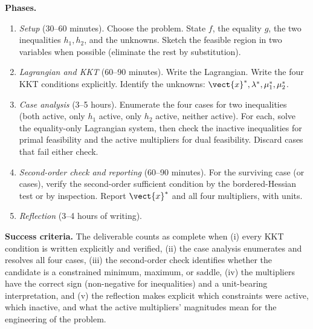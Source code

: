 \begin{project}
\textbf{Phases.}
\begin{enumerate}[leftmargin=*]
  \item \textit{Setup} (30--60 minutes). Choose the problem.
    State $f$, the equality $g$, the two inequalities $h_{1},
    h_{2}$, and the unknowns. Sketch the feasible region in two
    variables when possible (eliminate the rest by substitution).
  \item \textit{Lagrangian and KKT} (60--90 minutes). Write the
    Lagrangian. Write the four KKT conditions explicitly. Identify
    the unknowns: $\vect{x}^{*}, \lambda^{*}, \mu_{1}^{*},
    \mu_{2}^{*}$.
  \item \textit{Case analysis} (3--5 hours). Enumerate the four
    cases for two inequalities (both active, only $h_{1}$ active,
    only $h_{2}$ active, neither active). For each, solve the
    equality-only Lagrangian system, then check the inactive
    inequalities for primal feasibility and the active multipliers
    for dual feasibility. Discard cases that fail either check.
  \item \textit{Second-order check and reporting} (60--90 minutes).
    For the surviving case (or cases), verify the second-order
    sufficient condition by the bordered-Hessian test or by
    inspection. Report $\vect{x}^{*}$ and all four multipliers,
    with units.
  \item \textit{Reflection} (3--4 hours of writing).
\end{enumerate}

\textbf{Success criteria.} The deliverable counts as complete when
(i) every KKT condition is written explicitly and verified, (ii)
the case analysis enumerates and resolves all four cases, (iii)
the second-order check identifies whether the candidate is a
constrained minimum, maximum, or saddle, (iv) the multipliers have
the correct sign (non-negative for inequalities) and a unit-bearing
interpretation, and (v) the reflection makes explicit which
constraints were active, which inactive, and what the active
multipliers' magnitudes mean for the engineering of the problem.


\end{project}
